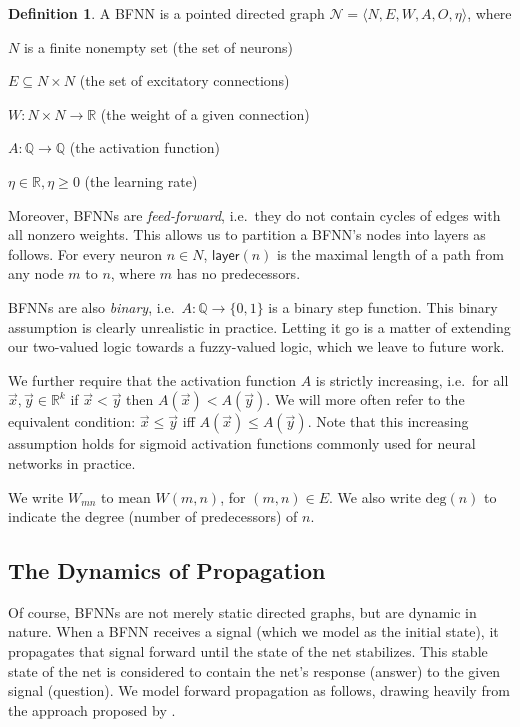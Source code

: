 \documentclass[letterpaper]{article}
\theoremstyle{definition}
\newtheorem{definition}{Definition}
\newcommand{\degree}[1]{\mathrm{deg}(#1)}
\newcommand{\layer}[1]{\mathsf{layer}(#1)}
\newcommand{\Net}{\mathcal{N}}
\begin{document}
\begin{definition} A BFNN is a pointed directed graph ${\Net = \langle N, E, W, A, O, \eta \rangle}$, where
\begin{compactitem}
    \item $N$ is a finite nonempty set (the set of neurons)
    \item $E \subseteq N \times N$ (the set of excitatory connections)
    \item $W : N \times N \to \mathbb{R}$ (the weight of a given connection)
    
    \item $A : \mathbb{Q} \to \mathbb{Q}$ (the activation function)
    \item $\eta \in \mathbb{R}, \eta \geq 0$ (the learning rate)
\end{compactitem}
\end{definition}
Moreover, BFNNs are \emph{feed-forward}, i.e.\ they do not contain cycles of edges with all nonzero weights. This allows us to partition a BFNN's nodes into layers as follows.  For every neuron $n \in N$, $\layer{n}$ is the maximal length of a path from any node $m$ to $n$, where $m$ has no predecessors.

BFNNs are also \emph{binary}, i.e.\ $A : \mathbb{Q} \to \{0, 1\}$ is a binary step function.  This binary assumption is clearly unrealistic in practice.  Letting it go is a matter of extending our two-valued logic towards a fuzzy-valued logic, which we leave to future work.

We further require that the activation function $A$ is strictly increasing, i.e.\ for all $\vec{x}, \vec{y} \in \mathbb{R}^k$ if $\vec{x} < \vec{y}$ then $A(\vec{x}) < A(\vec{y})$.  We will more often refer to the equivalent condition:  $\vec{x} \leq \vec{y}$ iff $A(\vec{x}) \leq A(\vec{y})$.  Note that this increasing assumption holds for sigmoid activation functions commonly used for neural networks in practice.

We write $W_{m n}$ to mean $W(m,n)$, for ${(m, n) \in E}$.  We also write $\degree{n}$ to indicate the degree (number of predecessors) of $n$.

\subsection{The Dynamics of Propagation}

Of course, BFNNs are not merely static directed graphs, but are dynamic in nature.  When a BFNN receives a signal (which we model as the initial state), it propagates that signal forward until the state of the net stabilizes.  This stable state of the net is considered to contain the net's response (answer) to the given signal (question).  We model forward propagation as follows, drawing heavily from the approach proposed by \citep{leitgeb2001nonmonotonic}.  
\end{document}
